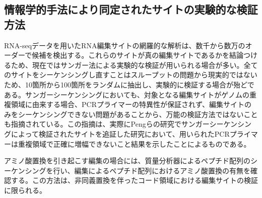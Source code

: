\subsection{情報学的手法により同定されたサイトの実験的な検証方法}
RNA-seqデータを用いたRNA編集サイトの網羅的な解析は、数千から数万のオーダーで候補を検出する。これらのサイトが真の編集サイトであるかを結論つけるため、現在ではサンガー法による実験的な検証が用いられる場合が多い。全てのサイトをシーケンシングし直すことはスループットの問題から現実的ではないため、10箇所から100箇所をランダムに抽出し、実験的に検証する場合が殆どである。サンガーシーケンシングにおいても、対象となる編集サイトがゲノムの重複領域に由来する場合、PCRプライマーの特異性が保証されず、編集サイトのみをシーケンシングできない問題があることから、万能の検証方法ではないことも指摘されている。この指摘は、実際にPengらの研究でサンガーシーケンシングによって検証されたサイトを追証した研究において、用いられたPCRプライマーは重複領域で正確に増幅できないこと結果を示したことによるものである。
\par
アミノ酸置換を引き起こす編集の場合には、質量分析器によるペプチド配列のシーケンシングを行い、編集によるペプチド配列におけるアミノ酸置換の有無を確認する。この方法は、非同義置換を伴ったコード領域における編集サイトの検証に限られる。

